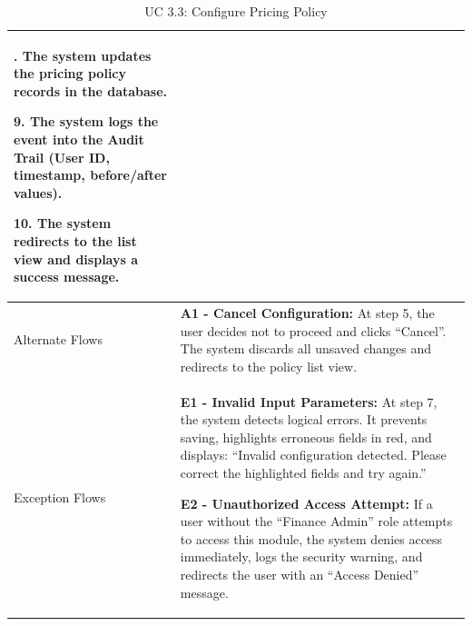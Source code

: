 \begin{table}[H]
\begin{tabularx}{\textwidth}{|>{\raggedright\arraybackslash}p{3.5cm}|>{\RaggedRight\arraybackslash}X|}
8. The system updates the pricing policy records in the database. \par
9. The system logs the event into the Audit Trail (User ID, timestamp, before/after values). \par
10. The system redirects to the list view and displays a success message. \\
\hline
Alternate Flows & 
\textbf{A1 - Cancel Configuration:} At step 5, the user decides not to proceed and clicks ``Cancel''. The system discards all unsaved changes and redirects to the policy list view. \\
\hline
Exception Flows & 
\textbf{E1 - Invalid Input Parameters:} At step 7, the system detects logical errors. It prevents saving, highlights erroneous fields in red, and displays: ``Invalid configuration detected. Please correct the highlighted fields and try again.'' \par \vspace{0.5em}
\textbf{E2 - Unauthorized Access Attempt:} If a user without the ``Finance Admin'' role attempts to access this module, the system denies access immediately, logs the security warning, and redirects the user with an ``Access Denied'' message. \\
\hline
\end{tabularx}
\caption{UC 3.3: Configure Pricing Policy}
\label{tab:uc3.3}
\end{table}